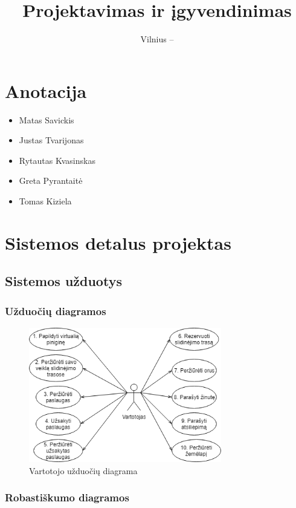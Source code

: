 \documentclass[oneside]{VUMIFPSkursinis}
\title{Projektavimas ir įgyvendinimas}
\date{Vilnius – \the\year}
\begin{document}
\maketitle
\tableofcontents

\section{Anotacija}
\begin{itemize}
	\item{Matas Savickis}
	\item{Justas Tvarijonas}
	\item{Rytautas Kvasinskas}
	\item{Greta Pyrantaitė}
	\item{Tomas Kiziela}
\end{itemize}

\section{Sistemos detalus projektas}
	\subsection{Sistemos užduotys}
		\subsubsection{Užduočių diagramos}


			\begin{figure}[h]
    				\centering
    				\includegraphics[width=0.75\textwidth]{useCaseVartotojas.png}
    				\caption{Vartotojo užduočių diagrama}
    				\label{fig:VartotojoUseCasel}
			\end{figure}
\pagebreak

	\subsubsection{Robastiškumo diagramos}
\end{document}
